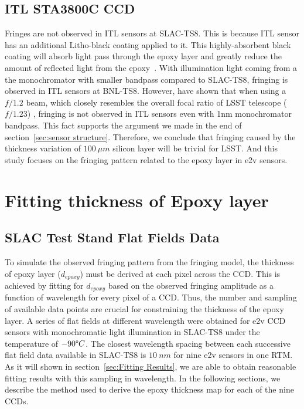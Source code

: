\documentclass[twocolumn]{aastex63} %
\begin{document}
\begin{CJK*}{UTF8}{gbsn}
\subsection{ITL STA3800C CCD} \label{sec: ITL sensor}
Fringes are not observed in ITL sensors at SLAC-TS8. This is because ITL sensor has an additional Litho-black coating applied to it. This highly-absorbent black coating will absorb light pass through the epoxy layer and greatly reduce the amount of reflected light from the epoxy~\citep{Connor22}. With illumination light coming from a the monochromator with smaller bandpass compared to SLAC-TS8, fringing is observed in ITL sensors at BNL-TS8. However, \citet{Craig20} have shown that when using a $f/1.2$ beam, which closely resembles the overall focal ratio of LSST telescope ($f/1.23$) \citep{Ivezi19}, fringing is not observed in ITL sensors even with 1nm monochromator bandpass. This fact supports the argument we made in the end of section~\ref{sec:sensor structure}. Therefore, we conclude that fringing caused by the thickness variation of $100\ \mu m$ silicon layer will be trivial for LSST. And this study focuses on the fringing pattern related to the epoxy layer in e2v sensors.

\section{Fitting thickness of Epoxy layer} \label{sec:Frining_fitting}

\subsection{SLAC Test Stand Flat Fields Data} \label{subsec:SLAC-TS8}

To simulate the observed fringing pattern from the fringing model, the thickness of epoxy layer ($d_{epoxy}$) must be derived at each pixel across the CCD. This is achieved by fitting for $d_{epoxy}$ based on the observed fringing amplitude as a function of wavelength for every pixel of a CCD. Thus, the number and sampling of available data points are crucial for constraining the thickness of the epoxy layer. A series of flat fields at different wavelength were obtained for e2v CCD sensors with monochromatic light illumination in SLAC-TS8 under the temperature of $-90 \degree C$. The closest wavelength spacing between each successive flat field data available in SLAC-TS8 is $10\ nm$ for nine e2v sensors in one RTM. As it will shown in section~\ref{sec:Fitting Results}, we are able to obtain reasonable fitting results with this sampling in wavelength.
In the following sections, we describe the method used to derive the epoxy thickness map for each of the nine CCDs.


\end{CJK*}
\end{document}
